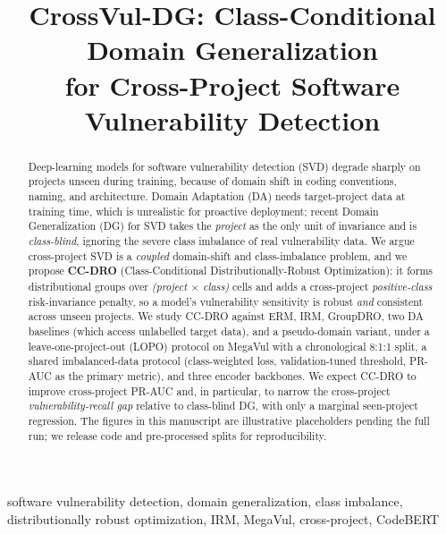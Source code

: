 \documentclass[conference]{IEEEtran}
\begin{document}
\title{CrossVul-DG: Class-Conditional Domain Generalization\\
for Cross-Project Software Vulnerability Detection}

\author{
}

\maketitle

\begin{abstract}
Deep-learning models for software vulnerability detection (SVD)
degrade sharply on projects unseen during training, because of
domain shift in coding conventions, naming, and architecture.
Domain Adaptation (DA) needs target-project data at training
time, which is unrealistic for proactive deployment; recent
Domain Generalization (DG) for SVD takes the \emph{project} as
the only unit of invariance and is \emph{class-blind}, ignoring
the severe class imbalance of real vulnerability data. We argue
cross-project SVD is a \emph{coupled} domain-shift and
class-imbalance problem, and we propose \textbf{CC-DRO}
(Class-Conditional Distributionally-Robust Optimization): it
forms distributional groups over \emph{(project $\times$ class)}
cells and adds a cross-project \emph{positive-class} risk-invariance
penalty, so a model's vulnerability sensitivity is robust
\emph{and} consistent across unseen projects. We study CC-DRO
against ERM, IRM, GroupDRO, two DA baselines (which access
unlabelled target data), and a pseudo-domain variant, under a
leave-one-project-out (LOPO) protocol on MegaVul with a
chronological 8:1:1 split, a shared imbalanced-data protocol
(class-weighted loss, validation-tuned threshold, PR-AUC as the
primary metric), and three encoder backbones. We expect CC-DRO
to improve cross-project PR-AUC and, in particular, to narrow
the cross-project \emph{vulnerability-recall gap} relative to
class-blind DG, with only a marginal seen-project regression.
The figures in this manuscript are illustrative placeholders
pending the full run; we release code and pre-processed splits
for reproducibility.
\end{abstract}

\begin{IEEEkeywords}
software vulnerability detection, domain generalization,
class imbalance, distributionally robust optimization, IRM,
MegaVul, cross-project, CodeBERT
\end{IEEEkeywords}
\end{document}
